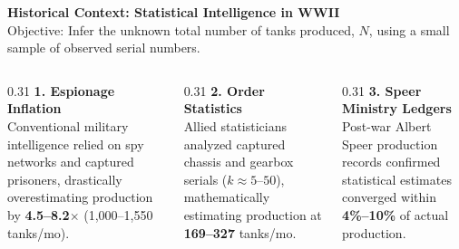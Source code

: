 \documentclass[aspectratio=169,10pt]{beamer}
\begin{document}
\begin{frame}[c]
  \begin{center}
    {\large \textbf{\color{headernavy} Historical Context: Statistical Intelligence in WWII}}\\[0.10cm]
    {\scriptsize \color{subgray} Objective: Infer the unknown total number of tanks produced, $N$, using a small sample of observed serial numbers.}
  \end{center}
  \vspace{0.35cm}
  
  \begin{columns}[t,onlytextwidth]
    \begin{column}{0.31\textwidth}
      {\small \textbf{\color{headernavy} 1. Espionage Inflation}}\\[0.08cm]
      {\scriptsize Conventional military intelligence relied on spy networks and captured prisoners, drastically overestimating production by \textbf{4.5--8.2$\times$} (1,000--1,550 tanks/mo).}
    \end{column}
    
    \begin{column}{0.31\textwidth}
      {\small \textbf{\color{headernavy} 2. Order Statistics}}\\[0.08cm]
      {\scriptsize Allied statisticians analyzed captured chassis and gearbox serials ($k \approx 5$--$50$), mathematically estimating production at \textbf{169--327} tanks/mo.}
    \end{column}
    
    \begin{column}{0.31\textwidth}
      {\small \textbf{\color{headernavy} 3. Speer Ministry Ledgers}}\\[0.08cm]
      {\scriptsize Post-war Albert Speer production records confirmed statistical estimates converged within \textbf{4\%--10\%} of actual production.}
    \end{column}
  \end{columns}
  
  \vspace{0.25cm}
  \begin{center}
  \end{center}
  

\end{frame}
\end{document}

